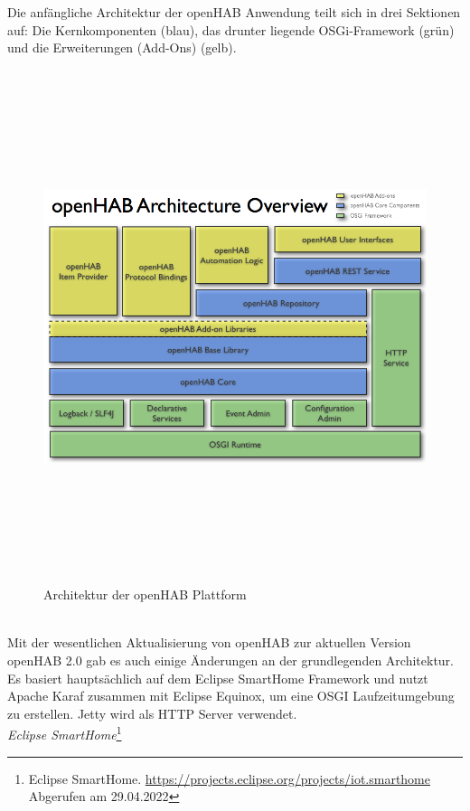     Die anfängliche Architektur der openHAB Anwendung teilt sich in drei Sektionen auf: Die Kernkomponenten (blau), das drunter 
    liegende OSGi-Framework (grün) und die Erweiterungen (Add-Ons) (gelb). 
    \begin{figure}[hbt!]
        \centering
        \includegraphics[width=15cm,height=15cm,keepaspectratio]{images/openhab-architecture.png}
        \caption{Architektur der openHAB Plattform \cite{openHAB-architecture2013}}
        \label{fig:architectureopenHAB}
    \end{figure}
    \\
    \linebreak
    Mit der wesentlichen Aktualisierung von openHAB zur aktuellen Version openHAB 2.0 gab es auch einige Änderungen an der 
    grundlegenden Architektur. Es basiert hauptsächlich auf dem Eclipse SmartHome Framework und nutzt Apache Karaf zusammen mit 
    Eclipse Equinox, um eine \acs{OSGI} Laufzeitumgebung zu erstellen. Jetty wird als \acs{HTTP} Server verwendet. 
    \\
    \linebreak
    \textit{Eclipse SmartHome}\footnote{Eclipse SmartHome. \url{https://projects.eclipse.org/projects/iot.smarthome} Abgerufen am 29.04.2022} 
